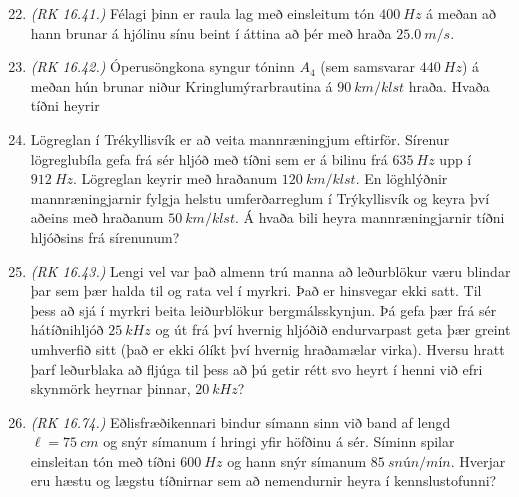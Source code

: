 \vspace{-0.2cm}
\begin{enumerate}[label = \textbf{Dæmi \thechapter.\arabic*.}]
\setcounter{enumi}{21}
\item \textit{(RK 16.41.)} Félagi þinn er raula lag með einsleitum tón $\SI{400}{Hz}$ á meðan að hann brunar á hjólinu sínu beint í áttina að þér með hraða $\SI{25.0}{m/s}$. 

\item \textit{(RK 16.42.)} Óperusöngkona syngur tóninn $A_4$ (sem samsvarar $\SI{440}{Hz}$) á meðan hún brunar niður Kringlumýrarbrautina á $\SI{90}{km/klst}$ hraða. Hvaða tíðni heyrir 

\item Lögreglan í Trékyllisvík er að veita mannræningjum eftirför. Sírenur lögreglubíla gefa frá sér hljóð með tíðni sem er á bilinu frá $\SI{635}{Hz}$ upp í $\SI{912}{Hz}$. Lögreglan keyrir með hraðanum $\SI{120}{km/klst}$. En löghlýðnir mannræningjarnir fylgja helstu umferðarreglum í Trýkyllisvík og keyra því aðeins með hraðanum $\SI{50}{km/klst}$. Á hvaða bili heyra mannræningjarnir tíðni hljóðsins frá sírenunum?

\item \textit{(RK 16.43.)} Lengi vel var það almenn trú manna að leðurblökur væru blindar þar sem þær halda til og rata vel í myrkri. Það er hinsvegar ekki satt. Til þess að sjá í myrkri beita leiðurblökur bergmálsskynjun. Þá gefa þær frá sér hátíðnihljóð $\SI{25}{kHz}$ og út frá því hvernig hljóðið endurvarpast geta þær greint umhverfið sitt (það er ekki ólíkt því hvernig hraðamælar virka). Hversu hratt þarf leðurblaka að fljúga til þess að þú getir rétt svo heyrt í henni við efri skynmörk heyrnar þinnar, $\SI{20}{kHz}$?

\item \textit{(RK 16.74.)} Eðlisfræðikennari bindur símann sinn við band af lengd $\ell = \SI{75}{cm}$ og snýr símanum í hringi yfir höfðinu á sér. Síminn spilar einsleitan tón með tíðni $\SI{600}{Hz}$ og hann snýr símanum $\SI{85}{snún/mín}$. Hverjar eru hæstu og lægstu tíðnirnar sem að nemendurnir heyra í kennslustofunni?


\end{enumerate}

